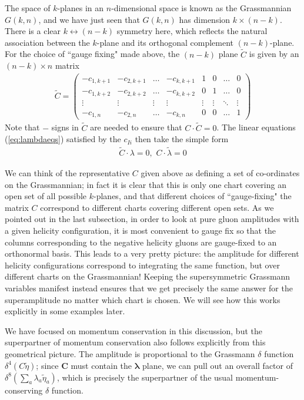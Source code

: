 \documentclass[12pt]{article}
\newcommand{\be}{\begin{eqnarray}}
\newcommand{\ee}{\end{eqnarray}}
\begin{document}
The space of $k$-planes in an $n$-dimensional space is known as the
Grassmannian $G(k,n)$, and we have just seen that $G(k,n)$ has
dimension $k\times (n-k) $. There is a clear $k \leftrightarrow
(n-k)$ symmetry here, which reflects the natural association between
the $k$-plane and its orthogonal complement $(n-k)$-plane. For the
choice of ``gauge fixing" made above, the $(n-k)$ plane $\tilde C$
is given by an $(n-k) \times n$ matrix \be \label{choicestar} \tilde
C = \left(\begin{array}{cccccccc} -c_{1,k+1} & -c_{2,k+1}  & \ldots
& -c_{k,k+1} & 1 & 0 & \ldots & 0 \\ -c_{1,k+2} & -c_{2,k+2} &
\ldots & -c_{k,k+2} & 0 & 1 & \ldots & 0 \\ \vdots & \vdots & \vdots
& \vdots & \vdots & \vdots & \ddots & \vdots \\ -c_{1,n}& -c_{2,n} &
\ldots & -c_{k,n} & 0 & 0 & \ldots & 1 \end{array} \right) \ee Note
that $-$ signs in $\tilde C$ are needed to ensure that $C \cdot
\tilde C = 0$. The linear equations (\ref{eq:lambdaeqs}) satisfied
by the $c_{Ii}$ then take the simple form \be \tilde C \cdot \lambda
= 0, \, \, C \cdot \tilde \lambda = 0 \ee

We can think of the representative $C$ given above as defining a set of co-ordinates  on the Grassmannian; in fact it is clear that this is only one chart covering an open set of all possible $k$-planes, and that different choices of ``gauge-fixing" the matrix $C$ correspond to different charts covering different open sets.
As we pointed out in the last subsection, in order to look at pure gluon amplitudes with a given helicity configuration, it is most convenient to gauge fix so that the columns corresponding to the negative helicity gluons are gauge-fixed to an orthonormal basis. This leads to a very pretty picture: the amplitude for different helicity configurations correspond to integrating the same function, but over different charts on the Grassmannian! Keeping the supersymmetric Grassmann variables manifest instead ensures that we get precisely the same answer for the superamplitude no matter which chart is chosen. We will see how this works explicitly in some examples later.

We have focused on momentum conservation in this discussion, but the superpartner of momentum conservation also follows explicitly from this geometrical picture. The amplitude is proportional to the Grassmann $\delta$ function $\delta^4(C \tilde \eta)$; since $\boldsymbol C$ must contain the $\boldsymbol{\lambda}$ plane, we can pull out an overall factor of  $\delta^8(\sum_a \lambda_a \tilde \eta_a)$, which is precisely the superpartner of the usual momentum-conserving $\delta$ function.
\end{document}
